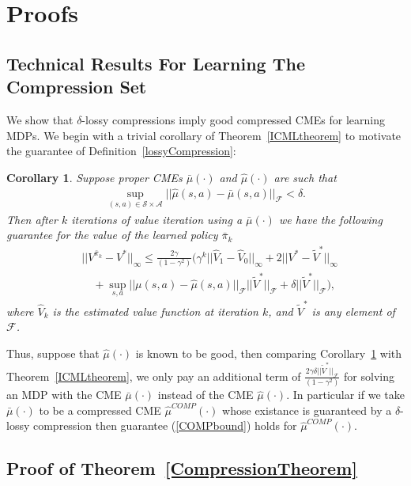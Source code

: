 \documentclass[letterpaper]{article}
\newtheorem{corollary}[theorem]{Corollary}
\newcommand{\cF}{{\mathcal F}}
\newcommand{\cA}{{\mathcal A}}
\newcommand{\cS}{{\mathcal S}}
\newcommand{\nn}{\nonumber}
\begin{document}
\section{Proofs}

\subsection{Technical Results For Learning The Compression Set} \label{learningCompressionAppendix}

We show that $\delta$-lossy compressions imply good compressed CMEs for learning MDPs. We begin with a trivial corollary of Theorem~\ref{ICMLtheorem} to motivate the guarantee of Definition~\ref{lossyCompression}:

\begin{corollary} \label{ICMLcorollary}
Suppose proper CMEs $\bar\mu(\cdot)$ and $\hat\mu(\cdot)$ are such that
\begin{align}
\sup_{(s,a)\in\cS\times\cA}||\hat\mu(s,a) - \bar\mu(s,a)||_\cF < \delta.
\end{align}
Then after $k$ iterations of value iteration using a  $\bar\mu(\cdot)$ we have the following guarantee for the value of the learned policy $\bar\pi_k$
\begin{align}
&||V^{\bar\pi_k} - V^*||_{\infty}\le \frac{2\gamma}{(1-\gamma^2)}\Big( \gamma^k ||\hat V_1 - \hat V_0||_{\infty} + 2|| V^* - \tilde V^* ||_{\infty}  \nn\\
&\quad+\sup_{s,a} ||\mu(s,a) - \hat\mu(s,a)||_{\cF}||\tilde V^*||_{\cF} + \delta||\tilde V^*||_{\cF} \Big), \label{COMPbound}
\end{align}
where $\hat V_k$ is the estimated value function at iteration $k$, and $\tilde V^*$ is any element of $\cF$.
\end{corollary}
Thus, suppose that $\hat\mu(\cdot)$ is known to be good, then comparing Corollary~\ref{ICMLcorollary} with Theorem~\ref{ICMLtheorem}, we only pay an additional term of $\frac{2\gamma \delta||\tilde V^*||_{\cF}}{(1-\gamma^2)}$ for solving an MDP with the CME $\bar\mu(\cdot)$ instead of the CME $\hat\mu(\cdot)$. In particular if we take $\bar\mu(\cdot)$ to be a compressed CME $\hat \mu^{COMP}(\cdot)$ whose existance is guaranteed by a $\delta$-lossy compression then guarantee (\ref{COMPbound}) holds for $\hat \mu^{COMP}(\cdot)$.

\subsection{Proof of Theorem~\ref{CompressionTheorem}}
\end{document}
